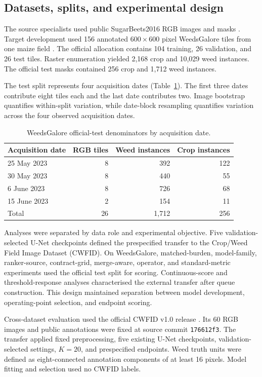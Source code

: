 \documentclass[preprint,12pt]{elsarticle}
\begin{document}
\subsection{Datasets, splits, and experimental design}

The source specialists used public SugarBeets2016 RGB images and masks \cite{chebrolu2017sugarbeets}. Target development used 156 annotated $600\times600$ pixel WeedsGalore tiles from one maize field \cite{celikkan2025weedsgalore}. The official allocation contains 104 training, 26 validation, and 26 test tiles. Raster enumeration yielded 2,168 crop and 10,029 weed instances. The official test masks contained 256 crop and 1,712 weed instances.

The test split represents four acquisition dates (Table~\ref{tab:dates}). The first three dates contribute eight tiles each and the last date contributes two. Image bootstrap quantifies within-split variation, while date-block resampling quantifies variation across the four observed acquisition dates.

\begin{table}[!t]
\centering
\caption{WeedsGalore official-test denominators by acquisition date.}
\label{tab:dates}
\small
\begin{tabular}{lrrr}
\toprule
Acquisition date & RGB tiles & Weed instances & Crop instances \\
\midrule
25 May 2023 & 8 & 392 & 122 \\
30 May 2023 & 8 & 440 & 55 \\
6 June 2023 & 8 & 726 & 68 \\
15 June 2023 & 2 & 154 & 11 \\
\midrule
Total & 26 & 1,712 & 256 \\
\bottomrule
\end{tabular}
\end{table}

Analyses were separated by data role and experimental objective. Five validation-selected U-Net checkpoints defined the prespecified transfer to the Crop/Weed Field Image Dataset (CWFID). On WeedsGalore, matched-burden, model-family, ranker-source, contract-grid, merge-aware, operator, and standard-metric experiments used the official test split for scoring. Continuous-score and threshold-response analyses characterised the external transfer after queue construction. This design maintained separation between model development, operating-point selection, and endpoint scoring.

Cross-dataset evaluation used the official CWFID v1.0 release \cite{haug2015cwfid}. Its 60 RGB images and public annotations were fixed at source commit \texttt{176612f3}. The transfer applied fixed preprocessing, five existing U-Net checkpoints, validation-selected settings, $K=20$, and prespecified endpoints. Weed truth units were defined as eight-connected annotation components of at least 16 pixels. Model fitting and selection used no CWFID labels.
\end{document}
